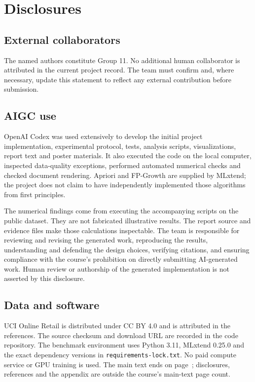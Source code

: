 \section{Disclosures}
\subsection*{External collaborators}
The named authors constitute Group 11. No additional human collaborator is attributed in the current project record. The team must confirm and, where necessary, update this statement to reflect any external contribution before submission.

\subsection*{AIGC use}
OpenAI Codex was used extensively to develop the initial project implementation, experimental protocol, tests, analysis scripts, visualizations, report text and poster materials. It also executed the code on the local computer, inspected data-quality exceptions, performed automated numerical checks and checked document rendering. Apriori and FP-Growth are supplied by MLxtend; the project does not claim to have independently implemented those algorithms from first principles.

The numerical findings come from executing the accompanying scripts on the public dataset. They are not fabricated illustrative results. The report source and evidence files make those calculations inspectable. The team is responsible for reviewing and revising the generated work, reproducing the results, understanding and defending the design choices, verifying citations, and ensuring compliance with the course's prohibition on directly submitting AI-generated work. Human review or authorship of the generated implementation is not asserted by this disclosure.

\subsection*{Data and software}
UCI Online Retail is distributed under CC BY 4.0 and is attributed in the references. The source checksum and download URL are recorded in the code repository. The benchmark environment uses Python 3.11, MLxtend 0.25.0 and the exact dependency versions in \texttt{requirements-lock.txt}. No paid compute service or GPU training is used. The main text ends on page~\pageref{maintextend}; disclosures, references and the appendix are outside the course's main-text page count.
